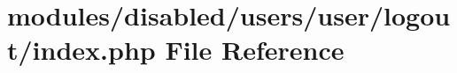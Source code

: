 \hypertarget{modules_2disabled_2users_2user_2logout_2index_8php}{\section{modules/disabled/users/user/logout/index.php File Reference}
\label{modules_2disabled_2users_2user_2logout_2index_8php}
}
